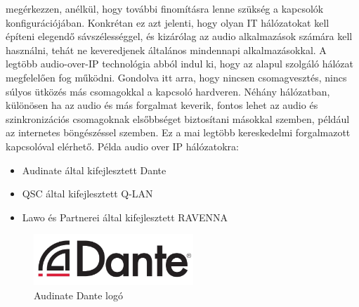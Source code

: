 megérkezzen, anélkül, hogy további finomításra lenne szükség a kapcsolók
konfigurációjában. Konkrétan ez azt jelenti, hogy olyan IT hálózatokat kell
építeni elegendő sávszélességgel, és kizárólag az audio alkalmazások számára
kell használni, tehát ne keveredjenek általános mindennapi alkalmazásokkal. 
A legtöbb audio-over-IP technológia abból indul ki, hogy az alapul szolgáló
hálózat megfelelően fog működni. Gondolva itt arra, hogy nincsen csomagvesztés, 
nincs súlyos ütközés más csomagokkal a kapcsoló hardveren. 
Néhány hálózatban, különösen ha az audio és más forgalmat keverik, 
fontos lehet az audio és szinkronizációs csomagoknak elsőbbséget biztosítani másokkal szemben,
például az internetes böngészéssel szemben. Ez a mai legtöbb kereskedelmi forgalmazott
kapcsolóval elérhető. 
Példa audio over IP hálózatokra:
\begin{itemize}
	\item Audinate által kifejlesztett Dante
\end{itemize}
\begin{itemize}
	\item QSC által kifejlesztett Q-LAN
\end{itemize}
\begin{itemize}
	\item Lawo és Partnerei által kifejlesztett RAVENNA
\end{itemize}
\begin{figure}[H]
	\centering
	\includegraphics[width=60mm, keepaspectratio]{figures/dante_logo.jpg}
	\caption{Audinate Dante logó}
	\label {fig:dante_logo}
\end{figure}
